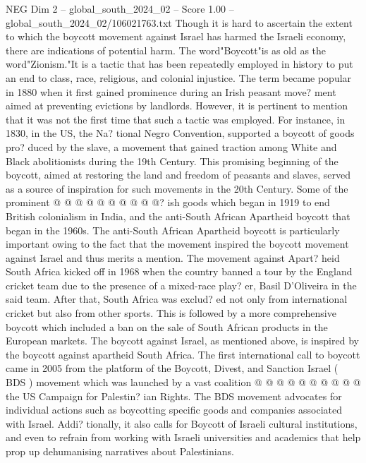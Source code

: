 \begin{textsample}{NEG Dim 2 – global\_south\_2024\_02 – Score 1.00 – global\_south\_2024\_02/106021763.txt}  \label{ex:f2_neg_252}
Though it is hard to ascertain the extent to which the boycott movement against Israel has harmed the Israeli economy, there are indications of potential harm.
The word"Boycott"is as old as the word"Zionism."It is a tactic that has been repeatedly employed in history to put an end to class, race, religious, and colonial injustice.
The term became popular in 1880 when it first gained prominence during an Irish peasant move? ment aimed at preventing evictions by landlords.
However, it is pertinent to mention that it was not the first time that such a tactic was employed.
For instance, in 1830, in the US, the Na? tional Negro Convention, supported a boycott of goods pro? duced by the slave, a movement that gained traction among White and Black abolitionists during the 19th Century.
This promising beginning of the boycott, aimed at restoring the land and freedom of peasants and slaves, served as a source of inspiration for such movements in the 20th Century.
Some of the prominent @ @ @ @ @ @ @ @ @ @? ish goods which began in 1919 to end British colonialism in India, and the anti-South African Apartheid boycott that began in the 1960s.
The anti-South African Apartheid boycott is particularly important owing to the fact that the movement inspired the boycott movement against Israel and thus merits a mention.
The movement against Apart? heid South Africa kicked off in 1968 when the country banned a tour by the England cricket team due to the presence of a mixed-race play? er, Basil D'Oliveira in the said team.
After that, South Africa was exclud? ed not only from international cricket but also from other sports.
This is followed by a more comprehensive boycott which included a ban on the sale of South African products in the European markets.
The boycott against Israel, as mentioned above, is inspired by the boycott against apartheid South Africa.
The first international call to boycott came in 2005 from the platform of the Boycott, Divest, and Sanction Israel ( BDS ) movement which was launched by a vast coalition @ @ @ @ @ @ @ @ @ @ the US Campaign for Palestin? ian Rights.
The BDS movement advocates for individual actions such as boycotting specific goods and companies associated with Israel.
Addi? tionally, it also calls for Boycott of Israeli cultural institutions, and even to refrain from working with Israeli universities and academics that help prop up dehumanising narratives about Palestinians.

\end{textsample}
